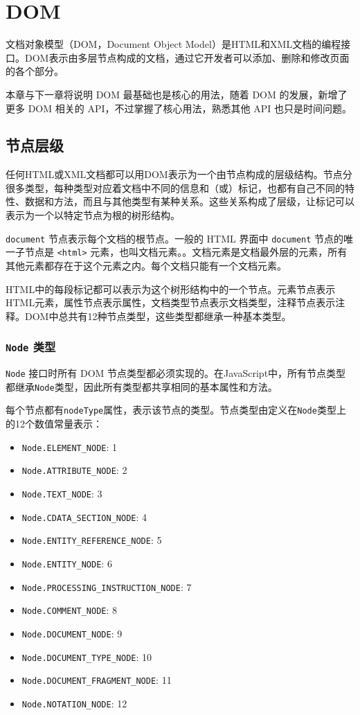 \section{DOM}

文档对象模型（DOM，Document  Object  Model）是HTML和XML文档的编程接口。DOM表示由多层节点构成的文档，通过它开发者可以添加、删除和修改页面的各个部分。

本章与下一章将说明 DOM 最基础也是核心的用法，随着 DOM 的发展，新增了更多 DOM 相关的 API，不过掌握了核心用法，熟悉其他 API 也只是时间问题。

\subsection{节点层级}

任何HTML或XML文档都可以用DOM表示为一个由节点构成的层级结构。节点分很多类型，每种类型对应着文档中不同的信息和（或）标记，也都有自己不同的特性、数据和方法，而且与其他类型有某种关系。这些关系构成了层级，让标记可以表示为一个以特定节点为根的树形结构。

\texttt{document} 节点表示每个文档的根节点。一般的 HTML 界面中 \texttt{document} 节点的唯一子节点是 \texttt{<html>} 元素，也叫文档元素。。文档元素是文档最外层的元素，所有其他元素都存在于这个元素之内。每个文档只能有一个文档元素。

HTML中的每段标记都可以表示为这个树形结构中的一个节点。元素节点表示HTML元素，属性节点表示属性，文档类型节点表示文档类型，注释节点表示注释。DOM中总共有12种节点类型，这些类型都继承一种基本类型。

\subsubsection{\texttt{Node} 类型}

\texttt{Node} 接口时所有 DOM 节点类型都必须实现的。在JavaScript中，所有节点类型都继承\texttt{Node}类型，因此所有类型都共享相同的基本属性和方法。

每个节点都有\texttt{nodeType}属性，表示该节点的类型。节点类型由定义在\texttt{Node}类型上的12个数值常量表示：

\begin{itemize}
    \item \texttt{Node.ELEMENT\_NODE}: 1
    \item \texttt{Node.ATTRIBUTE\_NODE}: 2
    \item \texttt{Node.TEXT\_NODE}: 3
    \item \texttt{Node.CDATA\_SECTION\_NODE}: 4
    \item \texttt{Node.ENTITY\_REFERENCE\_NODE}: 5
    \item \texttt{Node.ENTITY\_NODE}: 6
    \item \texttt{Node.PROCESSING\_INSTRUCTION\_NODE}: 7
    \item \texttt{Node.COMMENT\_NODE}: 8
    \item \texttt{Node.DOCUMENT\_NODE}: 9
    \item \texttt{Node.DOCUMENT\_TYPE\_NODE}: 10
    \item \texttt{Node.DOCUMENT\_FRAGMENT\_NODE}: 11
    \item \texttt{Node.NOTATION\_NODE}: 12
\end{itemize}

